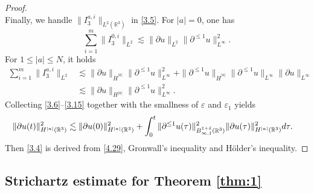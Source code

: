 \documentclass[11pt,twoside]{article}
\def\R{\mathop{\mathbb R\kern 0pt}\nolimits}
\def\p{\partial}
\def\ve{\varepsilon}
\def\ls{\lesssim}
\theoremstyle{plain}
\theoremstyle{definition}
\numberwithin{equation}{section}
\begin{document}
\begin{proof}
\begin{equation*}
\end{equation*}
Finally, we handle $\|I_3^{a,i}\|_{L^2(\mathbb{R}^3)}$ in \eqref{3.5}. For $|a|= 0$, one has
\begin{equation*}
\sum_{i=1}^{m}\|I_3^{0,i}\|_{L^2}\ls \|\p u\|_{L^2}\|\p^{\le 1} u\|_{L^\infty}^2.
\end{equation*}
For $1\le|a|\le N$, it holds
\begin{equation}\label{3.15}
\begin{split}
\sum_{i=1}^{m}\|I_3^{a,i}\|_{L^2}
&\ls \|\partial u\|_{\dot{H}^{|a|}} \|\partial^{\le1} u\|_{L^\infty}^2 + \|\partial^{\le 1} u\|_{\dot{H}^{|a|}} \|\partial^{\le1} u\|_{L^\infty}\|\partial u\|_{L^\infty}\\
&\ls 	\|\partial u\|_{{H}^{|a|}} \|\partial^{\le 1}  u\|_{L^\infty}^2.
\end{split}	
\end{equation}
Collecting \eqref{3.6}--\eqref{3.15} together with the smallness of  $\ve$ and $\ve_1$ yields
\begin{equation}\label{4.29}
\begin{aligned}
\|\partial  u(t)\|_{H^{|a|}(\mathbb{R}^3)}^2 &\lesssim \|\partial  u(0)\|_{H^{|a|}(\mathbb{R}^3)}^2
+\int_0^t   \|\partial^{\le1} u(\tau)\|_{B^{1+\delta}_{\infty,1}(\R^3)}^2   \|\partial  u(\tau )\|_{H^{|a|}(\mathbb{R}^3)}^2 d\tau.
\end{aligned}
\end{equation}
Then \eqref{3.4} is derived  from \eqref{4.29}, Gronwall's inequality and H\"older's inequality.
\end{proof}




\subsection{Strichartz estimate for Theorem \ref{thm:1}}
\end{document}
